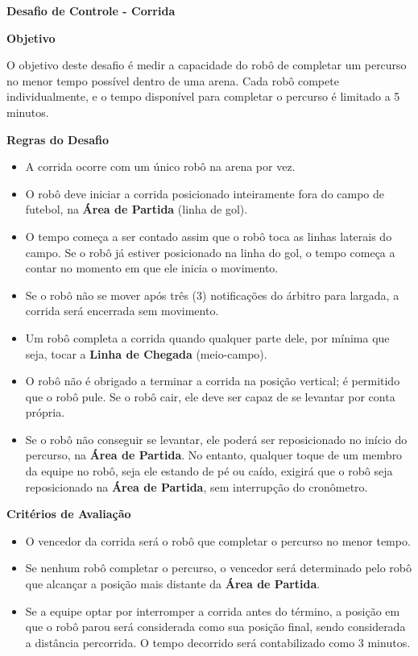 \clearpage
\sffamily
{\bfseries\color[rgb]{0.4,0.4,0.4}Desafio de Controle - Corrida}
{}

\bigskip

{\bfseries Objetivo}

\headlinebox

O objetivo deste desafio é medir a capacidade do robô de completar um percurso no menor tempo possível dentro de uma arena. Cada robô compete individualmente, e o tempo disponível para completar o percurso é limitado a 5 minutos.

\bigskip

{\bfseries Regras do Desafio}

\headlinebox

\begin{itemize}
	\item A corrida ocorre com um único robô na arena por vez.
	\item O robô deve iniciar a corrida posicionado inteiramente fora do campo de futebol, na \textbf{Área de Partida} (linha de gol).
	\item O tempo começa a ser contado assim que o robô toca as linhas laterais do campo. Se o robô já estiver posicionado na linha do gol, o tempo começa a contar no momento em que ele inicia o movimento.
	\item Se o robô não se mover após três (3) notificações do árbitro para largada, a corrida será encerrada sem movimento.
	\item Um robô completa a corrida quando qualquer parte dele, por mínima que seja, tocar a \textbf{Linha de Chegada} (meio-campo).
	\item O robô não é obrigado a terminar a corrida na posição vertical; é permitido que o robô pule. Se o robô cair, ele deve ser capaz de se levantar por conta própria.
	\item Se o robô não conseguir se levantar, ele poderá ser reposicionado no início do percurso, na \textbf{Área de Partida}. No entanto, qualquer toque de um membro da equipe no robô, seja ele estando de pé ou caído, exigirá que o robô seja reposicionado na \textbf{Área de Partida}, sem interrupção do cronômetro.
\end{itemize}

\bigskip

{\bfseries Critérios de Avaliação}

\headlinebox

\begin{itemize}
	\item O vencedor da corrida será o robô que completar o percurso no menor tempo.
	\item Se nenhum robô completar o percurso, o vencedor será determinado pelo robô que alcançar a posição mais distante da \textbf{Área de Partida}.
	\item Se a equipe optar por interromper a corrida antes do término, a posição em que o robô parou será considerada como sua posição final, sendo considerada a distância percorrida. O tempo decorrido será contabilizado como 3 minutos.
\end{itemize}

